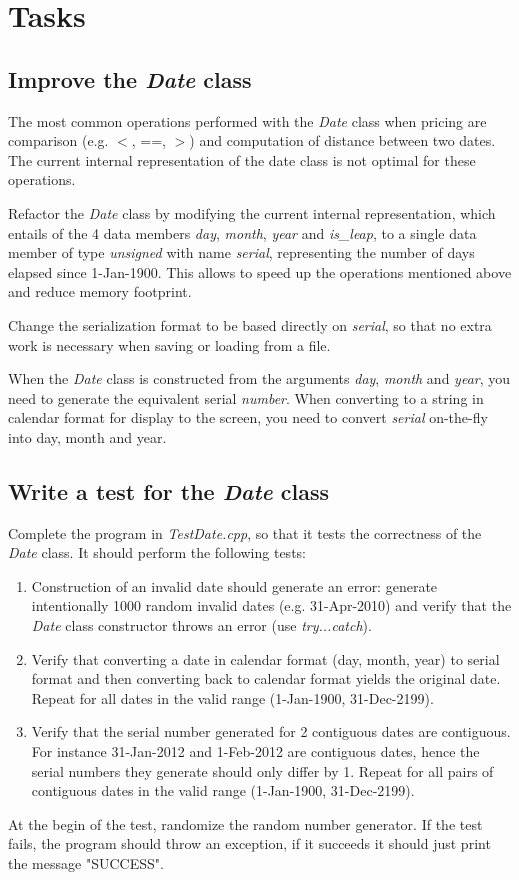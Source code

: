 \documentclass[10pt]{article}
\begin{document}
\section{Tasks}
\label{sec:task}

\subsection{Improve the \textit{Date} class}
The most common operations performed with the \textit{Date} class when pricing are comparison (e.g. $<$, ==, $>$) and computation of distance between two dates. The current internal representation of the date class is not optimal for these operations.

Refactor the \textit{Date} class by modifying the current internal representation, which entails of the 4 data members \textit{day}, \textit{month}, \textit{year} and \textit{is\_leap}, to a single data member of type \textit{unsigned} with name \textit{serial}, representing the number of days elapsed since 1-Jan-1900. This allows to speed up the operations mentioned above and reduce memory footprint.

Change the serialization format to be based directly on \textit{serial}, so that no extra work is necessary when saving or loading from a file.

When the \textit{Date} class is constructed from the arguments \textit{day}, \textit{month} and \textit{year}, you need to generate the equivalent serial \textit{number}. When converting to a string in calendar format for display to the screen, you need to convert \textit{serial} on-the-fly into day, month and year.


\subsection{Write a test for the \textit{Date} class}
Complete the program in \textit{TestDate.cpp}, so that it tests the correctness of the \textit{Date} class. It should perform the following tests:
\begin{enumerate}
\item Construction of an invalid date should generate an error: generate intentionally 1000 random invalid dates (e.g. 31-Apr-2010) and verify that the \textit{Date} class constructor throws an error (use \textit{try...catch}).
\item Verify that converting a date in calendar format (day, month, year) to serial format and then converting back to calendar format yields the original date. Repeat for all dates in the valid range (1-Jan-1900, 31-Dec-2199).
\item Verify that the serial number generated for 2 contiguous dates are contiguous. For instance 31-Jan-2012 and 1-Feb-2012 are contiguous dates, hence the serial numbers they generate should only differ by 1. Repeat for all pairs of contiguous dates in the valid range (1-Jan-1900, 31-Dec-2199).
\end{enumerate}
At the begin of the test, randomize the random number generator. If the test fails, the program should throw an exception, if it succeeds it should just print the message "SUCCESS".
\end{document}

